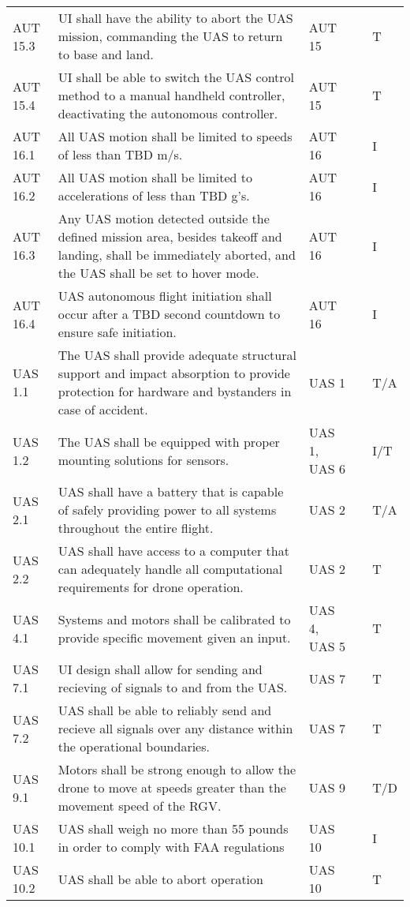 \begin{tabular}{lllll}
AUT 15.3 & UI shall have the ability to abort the UAS mission, commanding the UAS to return to base and land. & AUT 15 &  & T \\ 
AUT 15.4 & UI shall be able to switch the UAS control method to a manual handheld controller, deactivating the autonomous controller. & AUT 15 &  & T \\ 
AUT 16.1 & All UAS motion shall be limited to speeds of less than TBD m/s. & AUT 16 &  & I \\ 
AUT 16.2 & All UAS motion shall be limited to accelerations of less than TBD g’s. & AUT 16 &  & I \\ 
AUT 16.3 & Any UAS motion detected outside the defined mission area, besides takeoff and landing, shall be immediately aborted, and the UAS shall be set to hover mode. & AUT 16 &  & I \\ 
AUT 16.4 & UAS autonomous flight initiation shall occur after a TBD second countdown to ensure safe initiation. & AUT 16 &  & I \\ 
UAS 1.1 & The UAS shall provide adequate structural support and impact absorption to provide protection for hardware and bystanders in case of accident. & UAS 1 &  & T/A \\ 
UAS 1.2 & The UAS shall be equipped with proper mounting solutions for sensors. & UAS 1, UAS 6 &  & I/T \\ 
UAS 2.1 & UAS shall have a battery that is capable of safely providing power to all systems throughout the entire flight. & UAS 2 &  & T/A \\ 
UAS 2.2 & UAS shall have access to a computer that can adequately handle all computational requirements for drone 
operation. & UAS 2 &  & T \\ 
UAS 4.1 & Systems and motors shall be calibrated to provide specific movement given an input. & UAS 4, UAS 5 &  & T \\ 
UAS 7.1 & UI design shall allow for sending and recieving of signals to and from the UAS. & UAS 7 &  & T \\ 
UAS 7.2 & UAS shall be able to reliably send and recieve all signals over any distance within the operational boundaries. & UAS 7 &  & T \\ 
UAS 9.1 & Motors shall be strong enough to allow the drone to move at speeds greater than the movement speed of the RGV. & UAS 9 &  & T/D \\ 
UAS 10.1 & UAS shall weigh no more than 55 pounds in order to comply with FAA regulations & UAS 10 &  & I \\ 
UAS 10.2 & UAS shall be able to abort operation & UAS 10 &  & T \\ 

\end{tabular}
